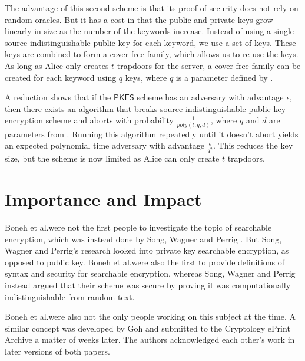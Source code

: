 \documentclass[a4paper,11pt]{article}
\begin{document}
    The advantage of this second scheme is that its proof of security does not rely on random oracles. But it has a cost in that the public and private keys grow linearly in size as the number of the keywords increase. Instead of using a single source indistinguishable public key for each keyword, we use a set of keys. These keys are combined to form a cover-free family, which allows us to re-use the keys. As long as Alice only creates $t$ trapdoors for the server, a cover-free family can be created for each keyword using $q$ keys, where $q$ is a parameter defined by \cite{du:cover-free-families}.

    A reduction shows that if the $\mathsf{PKES}$ scheme has an adversary with advantage $\epsilon$, then there exists an algorithm that breaks source indistinguishable public key encryption scheme and aborts with probability $\frac{1}{poly(t, q, d)}$, where $q$ and $d$ are parameters from \cite{du:cover-free-families}. Running this algorithm repeatedly until it doesn't abort yields an expected polynomial time adversary with advantage $\frac{\epsilon}{q^2}$. This reduces the key size, but the scheme is now limited as Alice can only create $t$ trapdoors.

    \section{Importance and Impact}
    Boneh et al.\@ were not the first people to investigate the topic of searchable encryption, which was instead done by Song, Wagner and Perrig \cite{848445}. But Song, Wagner and Perrig's research looked into private key searchable encryption, as opposed to public key. Boneh et al.\@ were also the first to provide definitions of syntax and security for searchable encryption, whereas Song, Wagner and Perrig instead argued that their scheme was secure by proving it was computationally indistinguishable from random text.

    Boneh et al.\@ were also not the only people working on this subject at the time. A similar concept was developed by Goh \cite{cryptoeprint:2003:216} and submitted to the Cryptology ePrint Archive a matter of weeks later. The authors acknowledged each other's work in later versions of both papers.
\end{document}
